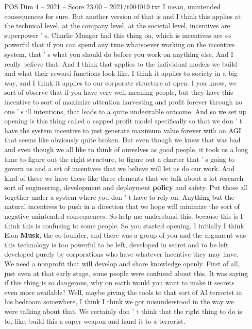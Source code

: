 \begin{textsample}{POS Dim 4 – 2021 – Score 23.00 – 2021/t004019.txt}
I mean, unintended consequences for sure.
But another version of that is and I think this applies at the technical level, at the company level, at the societal level, incentives are superpower ' s.
Charlie Munger had this thing on, which is incentives are so powerful that if you can spend any time whatsoever working on the incentive system, that ' s what you should do before you work on anything else.
And I really believe that.
And I think that applies to the individual models we build and what their reward functions look like.
I think it applies to society in a big way, and I think it applies to our corporate structure at open.
I you know, we sort of observe that if you have very well-meaning people, but they have this incentive to sort of maximize attention harvesting and profit forever through no one ' s ill intentions, that leads to a quite undesirable outcome.
And so we set up opening is this thing called a capped profit model specifically so that we don ' t have the system incentive to just generate maximum value forever with an AGI that seems like obviously quite broken.
But even though we knew that was bad and even though we all like to think of ourselves as good people, it took us a long time to figure out the right structure, to figure out a charter that ' s going to govern us and a set of incentives that we believe will let us do our work.
And kind of these we have these like three elements that we talk about a lot research sort of engineering, development and deployment \textbf{policy} and safety.
Put those all together under a system where you don ' t have to rely on.
Anything but the natural incentives to push in a direction that we hope will minimize the sort of negative unintended consequences.
So help me understand this, because this is I think this is confusing to some people.
So you started opening.
I initially I think Elon \textbf{Musk}, the co-founder, and there was a group of you and the argument was this technology is too powerful to be left, developed in secret and to be left developed purely by corporations who have whatever incentive they may have.
We need a nonprofit that will develop and share knowledge openly.
First of all, just even at that early stage, some people were confused about this.
It was saying if this thing is so dangerous, why on earth would you want to make it secrets even more available?
Well, maybe giving the tools to that sort of AI terrorist in his bedroom somewhere, I think I think we got misunderstood in the way we were talking about that.
We certainly don ' t think that the right thing to do is to, like, build this a super weapon and hand it to a terrorist.

\end{textsample}
